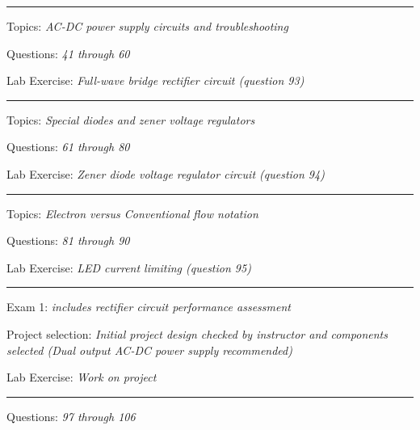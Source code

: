


\vskip 10pt
\hrule \vskip 5pt
\noindent
{}

\hskip 10pt Topics: {\it AC-DC power supply circuits and troubleshooting}
 
\hskip 10pt Questions: {\it 41 through 60}
 
\hskip 10pt Lab Exercise: {\it Full-wave bridge rectifier circuit (question 93)}
 

\vskip 10pt
\hrule \vskip 5pt
\noindent
{}

\hskip 10pt Topics: {\it Special diodes and zener voltage regulators}
 
\hskip 10pt Questions: {\it 61 through 80}
 
\hskip 10pt Lab Exercise: {\it Zener diode voltage regulator circuit (question 94)}
 
\vskip 10pt
\hrule \vskip 5pt
\noindent
{}

\hskip 10pt Topics: {\it Electron versus Conventional flow notation}
 
\hskip 10pt Questions: {\it 81 through 90}
 
\hskip 10pt Lab Exercise: {\it LED current limiting (question 95)}
 
\vskip 10pt
\hrule \vskip 5pt
\noindent
{}

\hskip 10pt Exam 1: {\it includes rectifier circuit performance assessment}
 
\hskip 10pt Project selection: {\it Initial project design checked by instructor and components selected (Dual output AC-DC power supply  recommended)}
  
\hskip 10pt Lab Exercise: {\it Work on project}

\vskip 10pt
\hrule \vskip 5pt
\noindent
{}

\hskip 10pt Questions: {\it 97 through 106}
 
